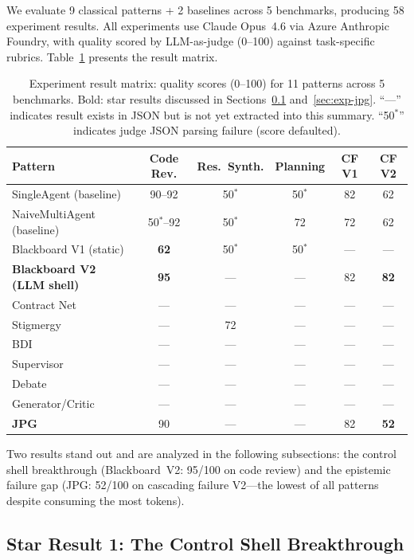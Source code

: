 \documentclass{article}
\begin{document}
We evaluate 9 classical patterns + 2 baselines across 5 benchmarks, producing 58
experiment results. All experiments use Claude Opus~4.6 via Azure Anthropic Foundry,
with quality scored by LLM-as-judge (0--100) against task-specific rubrics.
Table~\ref{tab:results} presents the result matrix.

\begin{table}[t]
\centering
\caption{Experiment result matrix: quality scores (0--100) for 11 patterns across 5
benchmarks. Bold: star results discussed in Sections~\ref{sec:exp-blackboard}
and~\ref{sec:exp-jpg}. ``---'' indicates result exists in JSON but is not yet extracted
into this summary. ``50$^*$'' indicates judge JSON parsing failure (score defaulted).}
\label{tab:results}
\small
\begin{tabular}{@{} l c c c c c @{}}
\toprule
\textbf{Pattern} & \textbf{Code Rev.} & \textbf{Res.\ Synth.} & \textbf{Planning} & \textbf{CF V1} & \textbf{CF V2} \\
\midrule
SingleAgent (baseline) & 90--92 & 50$^*$ & 50$^*$ & 82 & 62 \\
NaiveMultiAgent (baseline) & 50$^*$--92 & 50$^*$ & 72 & 72 & 62 \\
\midrule
Blackboard V1 (static) & \textbf{62} & 50$^*$ & 50$^*$ & --- & --- \\
\textbf{Blackboard V2 (LLM shell)} & \textbf{95} & --- & --- & 82 & \textbf{82} \\
Contract Net & --- & --- & --- & --- & --- \\
Stigmergy & --- & 72 & --- & --- & --- \\
BDI & --- & --- & --- & --- & --- \\
Supervisor & --- & --- & --- & --- & --- \\
Debate & --- & --- & --- & --- & --- \\
Generator/Critic & --- & --- & --- & --- & --- \\
\textbf{JPG} & 90 & --- & --- & 82 & \textbf{52} \\
\bottomrule
\end{tabular}
\end{table}

\noindent
Two results stand out and are analyzed in the following subsections: the control shell
breakthrough (Blackboard~V2: 95/100 on code review) and the epistemic failure gap
(JPG: 52/100 on cascading failure V2---the lowest of all patterns despite consuming
the most tokens).

\subsection{Star Result 1: The Control Shell Breakthrough}
\label{sec:exp-blackboard}
\end{document}
